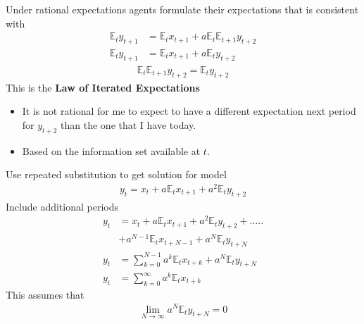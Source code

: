 \documentclass{beamer}
\begin{document}
\begin{frame}
  Under rational expectations agents formulate their expectations that is consistent with  
\begin{align}
  \mathbb{E}_ty_{t+1} &= \mathbb{E}_tx_{t+1} + a\mathbb{E}_t\mathbb{E}_{t+1}y_{t+2}\\ \nonumber
  \mathbb{E}_ty_{t+1} &= \mathbb{E}_tx_{t+1} + a\mathbb{E}_ty_{t+2}
\end{align}
\begin{align}
  \mathbb{E}_t\mathbb{E}_{t+1}y_{t+2} = \mathbb{E}_ty_{t+2}
\end{align}
\medskip
This is the \textbf{Law of Iterated Expectations}
\begin{itemize}
  \item It is not rational for me to expect to have a different expectation next period for $y_{t+2}$ than the one that I have today.
  \item Based on the information set available at $t$.
\end{itemize}
\end{frame}

\begin{frame}
  Use repeated substitution to get solution for model  
\begin{align}  
    y_t = x_t + a\mathbb{E}_tx_{t+1} + a^2\mathbb{E}_ty_{t+2} 
\end{align}
Include additional periods
\begin{align}
  y_t &= x_t + a\mathbb{E}_tx_{t+1} + a^2\mathbb{E}_ty_{t+2}+ .....\\ \nonumber &+a^{N-1}\mathbb{E}_tx_{t+N-1} + a^{N}\mathbb{E}_ty_{t+N}\\ \nonumber
  y_t &= \sum^{N-1}_{k=0}a^k\mathbb{E}_tx_{t+k} + a^{N}\mathbb{E}_ty_{t+N}\\ \nonumber
  y_t &= \sum^\infty_{k=0}a^k\mathbb{E}_tx_{t+k}
\end{align}
 This assumes that 
 \begin{align}
   \lim_{N \rightarrow \infty} a^{N}\mathbb{E}_ty_{t+N} = 0
 \end{align}
\end{frame}
\end{document}
